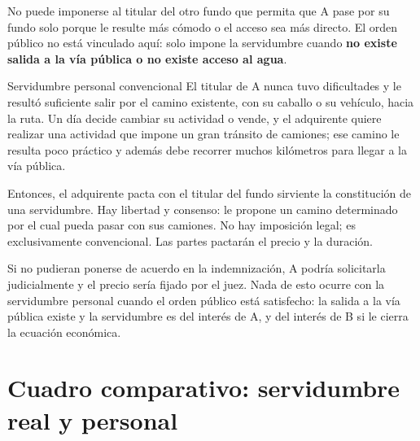 \documentclass[12pt,oneside]{book}
\begin{document}
No puede imponerse al titular del otro fundo que permita que A pase por su fundo solo porque le resulte más cómodo o el acceso sea más directo. El orden público no está vinculado aquí: solo impone la servidumbre cuando \textbf{no existe salida a la vía pública o no existe acceso al agua}.

\begin{example}{Servidumbre personal convencional}
El titular de A nunca tuvo dificultades y le resultó suficiente salir por el camino existente, con su caballo o su vehículo, hacia la ruta. Un día decide cambiar su actividad o vende, y el adquirente quiere realizar una actividad que impone un gran tránsito de camiones; ese camino le resulta poco práctico y además debe recorrer muchos kilómetros para llegar a la vía pública.

Entonces, el adquirente pacta con el titular del fundo sirviente la constitución de una servidumbre. Hay libertad y consenso: le propone un camino determinado por el cual pueda pasar con sus camiones. No hay imposición legal; es exclusivamente convencional. Las partes pactarán el precio y la duración.

Si no pudieran ponerse de acuerdo en la indemnización, A podría solicitarla judicialmente y el precio sería fijado por el juez. Nada de esto ocurre con la servidumbre personal cuando el orden público está satisfecho: la salida a la vía pública existe y la servidumbre es del interés de A, y del interés de B si le cierra la ecuación económica.
\end{example}

\section{Cuadro comparativo: servidumbre real y personal}
\end{document}
